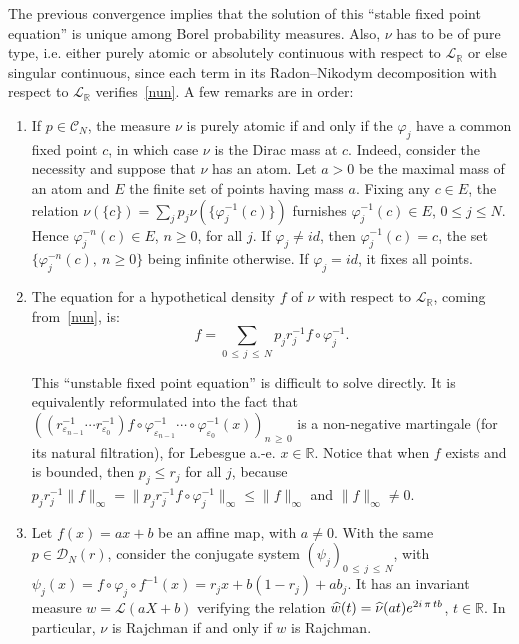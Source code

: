 \documentclass[10pt]{amsart}
\theoremstyle{definition}\newtheorem{defi}[theo]{Definition}\newtheorem{rema}[theo]{Remark}\newtheorem{exam}[theo]{Example}\newtheorem{exem}[theo]{Example}\newtheorem{nota}[theo]{Notation}
\newcommand{\Rbb}{\mathbb R}
\newcommand{\Lcl}{\mathcal{L}}
\newcommand{\Ccl}{\mathcal{C}}
\newcommand{\Dcl}{\mathcal{D}}
\newcommand*{\romanenumi}{\renewcommand*{\theenumi}{\roman{enumi}}}
\let\oldhat\hat
\renewcommand*{\hat}[1]{\mathchoice{\widehat{#1}}{\widehat{#1}}{\oldhat{#1}}{\oldhat{#1}}}
\begin{document}
The previous convergence implies that the solution of this ``stable fixed point equation'' is unique among Borel probability measures. Also, $\nu$ has to be of pure type, i.e. either purely atomic or absolutely continuous with respect to ${\Lcl}_{\Rbb}$ or else singular continuous, since each term in its Radon--Nikodym decomposition with respect to ${\Lcl}_{\Rbb}$ verifies~\eqref{nun}. A few remarks are in order:

\begin{enumerate}\romanenumi
\item \label{first-i} If $p\in{\Ccl}_N$, the measure $\nu$ is purely atomic if and only if the $\varphi_j$ have a common fixed point $c$, in which case $\nu$ is the Dirac mass at $c$. Indeed, consider the necessity and suppose that $\nu$ has an atom. Let $a>0$ be the maximal mass of an atom and $E$ the finite set of points having mass $a$. Fixing any $c\in E$, the relation $\nu(\{c\})=\sum_jp_j\nu(\{\varphi_j^{-1}(c)\})$ furnishes $\varphi_j^{-1}(c)\in E$, $0\leq j\leq N$. Hence $\varphi_j^{-n}(c)\in E$, $n\geq0$, for all $j$. If $\varphi_j\not=id$, then $\varphi_j^{-1}(c)=c$, the set $\{\varphi_j^{-n}(c),~n\geq0\}$ being infinite otherwise. If $\varphi_j=id$, it fixes all points.


\item \label{first-ii}The equation for a hypothetical density $f$ of $\nu$ with respect to ${\Lcl}_{\Rbb}$, coming from~\eqref{nun}, is:
\[
f=\sum_{0\,\leq\,j\,\leq\,N}p_jr_j^{-1}f\circ \varphi_j^{-1}.
\]

This ``unstable fixed point equation'' is difficult to solve directly. It is equivalently reformulated into the fact that $((r_{\varepsilon_{n-1}}^{-1}\cdots r_{\varepsilon_0}^{-1})f\circ \varphi^{-1}_{\varepsilon_{n-1}}\cdots\circ\varphi_{\varepsilon_0}^{-1}(x))_{n\,\geq\,0}$ is a non-negative martingale (for its natural filtration), for Lebesgue a.-e. $x\in\Rbb$. Notice that when $f$ exists and is bounded, then $p_j\leq r_j$ for all $j$, because $p_jr_j^{-1}\|f\|_{\infty}=\|p_jr_j^{-1}f\circ \varphi_j^{-1}\|_{\infty}\leq \|f\|_{\infty}$ and $\|f\|_{\infty}\not=0$.

\item \label{first-iii}Let $f(x)=ax+b$ be an affine map, with $a\not=0$. With the same $p\in{\Dcl}_N(r)$, consider the conjugate system $(\psi_j)_{0\,\leq\,j\,\leq\,N}$, with $\psi_j(x)=f\circ \varphi_j\circ f^{-1}(x)=r_jx+b(1-r_j)+ab_j$. It has an invariant measure $w={\Lcl}(aX+b)$ verifying the relation $\hat{w}(t)=\hat{\nu}(at)e^{2i\,\pi\,tb}$, $t\in\Rbb$. In particular, $\nu$ is Rajchman if and only if $w$ is Rajchman.


\end{enumerate}
\end{document}
